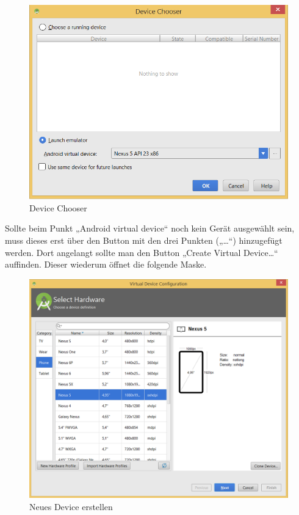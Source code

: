 \begin{figure}[H]
	\begin{center}
		\includegraphics[width=1.0\linewidth]{images/device_chooser.png}
		\caption{Device Chooser}
		\label{device_chooser}
	\end{center}
\end{figure}

Sollte beim Punkt „Android virtual device“ noch kein Gerät ausgewählt sein, muss dieses erst über den Button mit den drei Punkten („…“) hinzugefügt werden. Dort angelangt sollte man den Button „Create Virtual Device…“ auffinden. Dieser wiederum öffnet die folgende Maske.

\begin{figure}[H]
	\begin{center}
		\includegraphics[width=1.0\linewidth]{images/new_device.png}
		\caption{Neues Device erstellen}
		\label{Neues Device erstellen}
	\end{center}
\end{figure}

